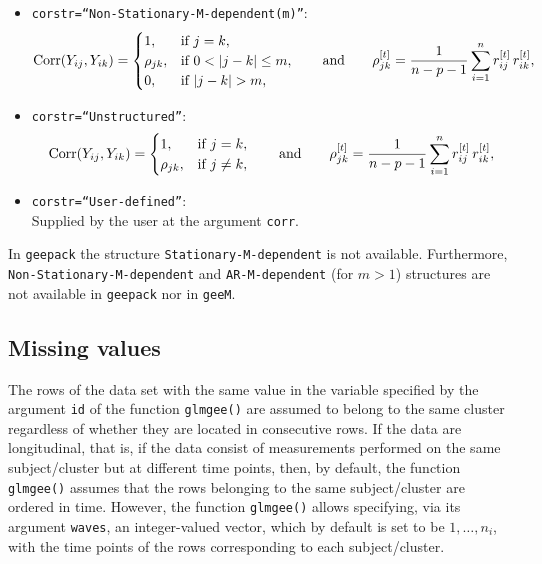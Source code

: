 \begin{itemize}
\item {\tt corstr=``Non-Stationary-M-dependent(m)''}:\\
$${\rm Corr}(Y_{ij},Y_{ik})=
\begin{cases}
1,    & \text{if }j=k,\\
\rho_{jk}, & \text{if }0<|j-k|\leq m,\\
0, & \text{if }|j-k|>m,
\end{cases}\qquad\text{and}\qquad
{\rho}^{[t]}_{jk}=\dfrac{1}{n-p-1}\sum\limits_{i=1}^n r^{[t]}_{ij}\,r^{[t]}_{ik},
$$
\item {\tt corstr=``Unstructured''}:\\
$${\rm Corr}(Y_{ij},Y_{ik})=
\begin{cases}
1,    & \text{if }j=k,\\
\rho_{jk}, & \text{if } j\neq k,
\end{cases}\qquad\text{and}\qquad
{\rho}^{[t]}_{jk}=\dfrac{1}{n-p-1}\sum\limits_{i=1}^n r^{[t]}_{ij}\,r^{[t]}_{ik},
$$
\item {\tt corstr=``User-defined''}:\\
Supplied by the user at the argument {\tt corr}.
\end{itemize}
In {\tt geepack} the structure {\tt Stationary-M-dependent} is not available. Furthermore, {\tt Non-Stationary-M-dependent} and {\tt AR-M-dependent} (for $m>1$) structures are not available in {\tt geepack} nor in {\tt geeM}.

\subsection{Missing values}
The rows of the data set with the same value in the variable specified by the argument {\tt id} of the function {\tt glmgee()} are assumed to belong to the same cluster regardless of whether they are located in consecutive rows. If the data are longitudinal, that is, if the data consist of measurements performed on the same subject/cluster but at different time points, then, by default, the function {\tt glmgee()} assumes that the rows belonging to the same subject/cluster are ordered in time. However, the function {\tt glmgee()} allows specifying, via its argument {\tt waves}, an integer-valued vector, which by default is set to be $1,\ldots,n_i$, with the time points of the rows corresponding to each subject/cluster.\\

